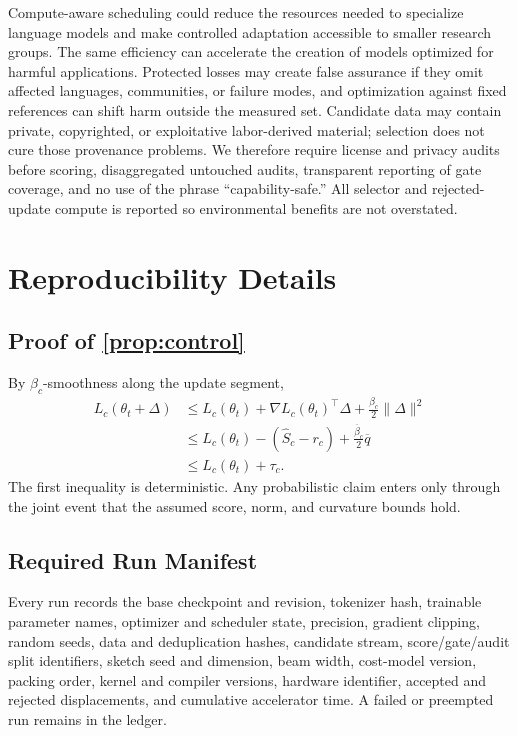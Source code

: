 \documentclass{article}
\begin{document}
Compute-aware scheduling could reduce the resources needed to specialize
language models and make controlled adaptation accessible to smaller research
groups. The same efficiency can accelerate the creation of models optimized
for harmful applications. Protected losses may create false assurance if they
omit affected languages, communities, or failure modes, and optimization
against fixed references can shift harm outside the measured set. Candidate
data may contain private, copyrighted, or exploitative labor-derived material;
selection does not cure those provenance problems. We therefore require
license and privacy audits before scoring, disaggregated untouched audits,
transparent reporting of gate coverage, and no use of the phrase
``capability-safe.'' All selector and rejected-update compute is reported so
environmental benefits are not overstated.




\clearpage
\appendix
\onecolumn

\section{Reproducibility Details}
\label{app:reproducibility}

\subsection{Proof of \cref{prop:control}}
By $\beta_c$-smoothness along the update segment,
\begin{align}
L_c(\theta_t+\Delta)
&\le L_c(\theta_t)+\nabla L_c(\theta_t)^\top\Delta
  +\frac{\beta_c}{2}\|\Delta\|^2\\
&\le L_c(\theta_t)-(\widehat S_c-r_c)
  +\frac{\overline\beta_c}{2}\overline q\\
&\le L_c(\theta_t)+\tau_c.
\end{align}
The first inequality is deterministic. Any probabilistic claim enters only
through the joint event that the assumed score, norm, and curvature bounds
hold.

\subsection{Required Run Manifest}
Every run records the base checkpoint and revision, tokenizer hash, trainable
parameter names, optimizer and scheduler state, precision, gradient clipping,
random seeds, data and deduplication hashes, candidate stream, score/gate/audit
split identifiers, sketch seed and dimension, beam width, cost-model version,
packing order, kernel and compiler versions, hardware identifier, accepted and
rejected displacements, and cumulative accelerator time. A failed or
preempted run remains in the ledger.
\end{document}

